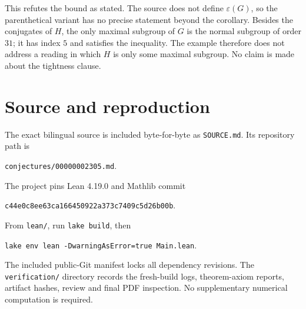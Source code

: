 \documentclass[11pt]{article}
\theoremstyle{remark}
\begin{document}
This refutes the bound as stated. The source does not define
$\varepsilon(G)$, so the parenthetical variant has no precise statement
beyond the corollary. Besides the conjugates of $H$, the only maximal
subgroup of $G$ is the normal subgroup of order $31$; it has index $5$
and satisfies the inequality. The example therefore does not address a
reading in which $H$ is only some maximal subgroup. No claim is made
about the tightness clause.

\section*{Source and reproduction}
The exact bilingual source is included byte-for-byte as
\texttt{SOURCE.md}. Its repository path is
\begin{center}\small\texttt{conjectures/00000002305.md}.\end{center}
The project pins Lean 4.19.0 and Mathlib commit
\begin{center}\small\texttt{c44e0c8ee63ca166450922a373c7409c5d26b00b}.\end{center}
From \texttt{lean/}, run \texttt{lake build}, then
\begin{center}\small\texttt{lake env lean -DwarningAsError=true Main.lean}.\end{center}
The included public-Git manifest locks all dependency revisions.
The \texttt{verification/} directory records the fresh-build logs,
theorem-axiom reports, artifact hashes, review and final PDF inspection.
No supplementary numerical computation is required.
\end{document}
